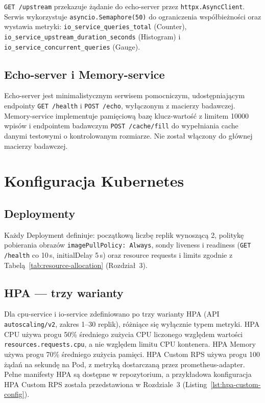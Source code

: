 \texttt{GET /upstream} przekazuje żądanie do echo-server przez \texttt{httpx.AsyncClient}. Serwis wykorzystuje \texttt{asyncio.Semaphore(50)} do ograniczenia współbieżności oraz wystawia metryki: \texttt{io\_service\_queries\_total} (Counter), \texttt{io\_service\_upstream\_duration\_seconds} (Histogram) i \texttt{io\_service\_concurrent\_queries} (Gauge).

\subsection{Echo-server i Memory-service}

Echo-server jest minimalistycznym serwisem pomocniczym, udostępniającym endpointy \texttt{GET /health} i \texttt{POST /echo}, wyłączonym z macierzy badawczej. Memory-service implementuje pamięciową bazę klucz-wartość z limitem 10000 wpisów i endpointem badawczym \texttt{POST /cache/fill} do wypełniania cache danymi testowymi o kontrolowanym rozmiarze. Nie został włączony do głównej macierzy badawczej.

\section{Konfiguracja Kubernetes}

\subsection{Deploymenty}

Każdy Deployment definiuje: początkową liczbę replik wynoszącą 2, politykę pobierania obrazów \texttt{imagePullPolicy: Always}, sondy liveness i readiness (\texttt{GET /health} co 10\,s, initialDelay 5\,s) oraz resource requests i limits zgodnie z Tabelą~\ref{tab:resource-allocation} (Rozdział~3).

\subsection{HPA — trzy warianty}

Dla cpu-service i io-service zdefiniowano po trzy warianty HPA (API \texttt{autoscaling/v2}, zakres 1--30 replik), różniące się wyłącznie typem metryki. HPA CPU używa progu 50\% średniego zużycia CPU liczonego względem wartości \texttt{resources.requests.cpu}, a nie względem limitu CPU kontenera. HPA Memory używa progu 70\% średniego zużycia pamięci. HPA Custom RPS używa progu 100 żądań na sekundę na Pod, z metryką dostarczaną przez prometheus-adapter. Pełne manifesty HPA są dostępne w repozytorium, a przykładowa konfiguracja HPA Custom RPS została przedstawiona w Rozdziale~3 (Listing~\ref{lst:hpa-custom-config}).

